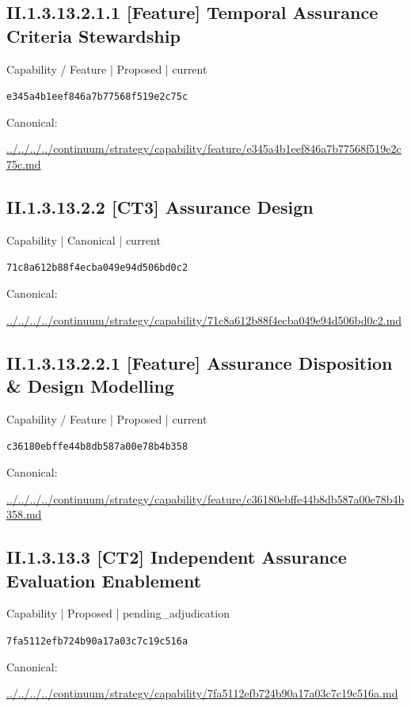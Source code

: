 \documentclass[10pt,a4paper]{article}
\begin{document}
\subsection*{II.1.3.13.2.1.1 [Feature] Temporal Assurance Criteria Stewardship}
{\small Capability / Feature | Proposed | current}\par
\texttt{e345a4b1eef846a7b77568f519e2c75c}\par
Canonical: \par
{\footnotesize\url{../../../../continuum/strategy/capability/feature/e345a4b1eef846a7b77568f519e2c75c.md}}\par
\subsection*{II.1.3.13.2.2 [CT3] Assurance Design}
{\small Capability | Canonical | current}\par
\texttt{71c8a612b88f4ecba049e94d506bd0c2}\par
Canonical: \par
{\footnotesize\url{../../../../continuum/strategy/capability/71c8a612b88f4ecba049e94d506bd0c2.md}}\par
\subsection*{II.1.3.13.2.2.1 [Feature] Assurance Disposition \& Design Modelling}
{\small Capability / Feature | Proposed | current}\par
\texttt{c36180ebffe44b8db587a00e78b4b358}\par
Canonical: \par
{\footnotesize\url{../../../../continuum/strategy/capability/feature/c36180ebffe44b8db587a00e78b4b358.md}}\par
\subsection*{II.1.3.13.3 [CT2] Independent Assurance Evaluation Enablement}
{\small Capability | Proposed | pending\_adjudication}\par
\texttt{7fa5112efb724b90a17a03c7c19c516a}\par
Canonical: \par
{\footnotesize\url{../../../../continuum/strategy/capability/7fa5112efb724b90a17a03c7c19c516a.md}}\par
\end{document}
